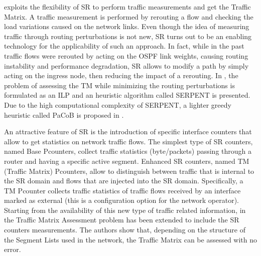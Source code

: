 \cite{polverini2018routing} exploits the flexibility of SR to perform traffic measurements and get the Traffic Matrix.
A traffic measurement is performed by rerouting a flow and checking the load variations caused on the network links.
Even though the idea of measuring traffic through routing perturbations is not new, SR turns out to be an enabling technology for the applicability of such an approach.
In fact, while in the past traffic flows were rerouted by acting on the OSPF link weights, causing routing instability and performance degradation, SR allows to modify a path by simply acting on the ingress node, then reducing the impact of a rerouting.
In \cite{polverini2018routing}, the problem of assessing the TM while minimizing the routing perturbations is formulated as an ILP and an heuristic algorithm called SERPENT is presented.
Due to the high computational complexity of SERPENT, a lighter greedy heuristic called PaCoB is proposed in \cite{cianfrani2018heuristic}.

An attractive feature of SR is the introduction of specific interface counters that allow to get statistics on network traffic flows. 
The simplest type of SR counters, named Base Pcounters, collect traffic statistics (byte/packets) passing through a router and having a specific active segment.
Enhanced SR counters, named TM (Traffic Matrix) Pcounters, allow to distinguish between traffic that is internal to the SR domain and flows that are injected into the SR domain.
Specifically, a TM Pcounter collects traffic statistics of traffic flows received by an interface marked as external (this is a configuration option for the network operator).
Starting from the availability of this new type of traffic related information, in \cite{polveriniNoF2018} the Traffic Matrix Assessment problem has been extended to include the SR counters measurements. The authors show that, depending on the structure of the Segment Lists used in the network, the Traffic Matrix can be assessed with no error.

